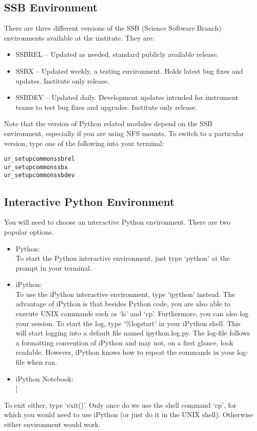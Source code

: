 \subsection{SSB Environment}
There are three different versions of the SSB (Science Software Branch) environments
available at the institute.  They are:
\begin{itemize}
\item  SSBREL -- Updated as needed, standard publicly available release.
\item SSBX -- Updated weekly, a testing environment.  Holds latest
  bug fixes and updates.  Institute only release.
\item SSBDEV -- Updated daily.  Development updates intended for
  instrument teams to test bug fixes and upgrades.  Institute only
  release. 
\end{itemize}
Note that the version of Python related modules depend on the SSB
environment, especially if you are using NFS mounts.  To switch
to a particular version, type one of the following into your terminal: 
\begin{alltt}
\termtab ur_setup common ssbrel
\termtab ur_setup common ssbx
\termtab ur_setup common ssbdev
\end{alltt}

\subsection{Interactive Python Environment}
You will need to choose an interactive Python environment.  There are
two popular options.
\begin{itemize}
\item Python: \\
  To start the Python interactive environment, just type `python' at
  the prompt in your terminal.
\item iPython: \\
  To use the iPython interactive environment, type `ipython' instead.
  The advantage of iPython is that besides Python code, you are also
  able to execute UNIX commands such as `ls' and `cp'.  Furthermore,
  you can also log your session.  To start the log, type `\%logstart'
  in your iPython shell.  This will start logging into a default file
  named ipython.log.py.  The log-file follows a formatting convention
  of iPython and may not, on a first glance, look readable. However,
  iPython knows how to repeat the commands in your log-file when ran.
 \item iPython Notebook: \\
  [[... Heather will summarize...]]
\end{itemize}
To exit either, type `exit()'.  Only once do we use the shell command
`cp', for which you would need to use iPython (or just do it in the
UNIX shell).  Otherwise either environment would work.

